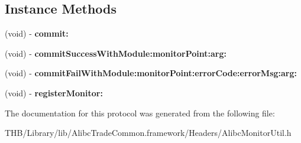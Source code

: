 \subsection*{Instance Methods}
\begin{DoxyCompactItemize}
\item 
\mbox{\label{protocol_alibc_trade_app_monitor_adapter_01-p_aec1a9063798149b59fa96aa601b44444}} 
(void) -\/ {\bfseries commit\+:}
\item 
\mbox{\label{protocol_alibc_trade_app_monitor_adapter_01-p_aa18270ea740aa94e6368a498f4a25fb4}} 
(void) -\/ {\bfseries commit\+Success\+With\+Module\+:monitor\+Point\+:arg\+:}
\item 
\mbox{\label{protocol_alibc_trade_app_monitor_adapter_01-p_aa58e8778c4e98ffc770f083e2ce935d7}} 
(void) -\/ {\bfseries commit\+Fail\+With\+Module\+:monitor\+Point\+:error\+Code\+:error\+Msg\+:arg\+:}
\item 
\mbox{\label{protocol_alibc_trade_app_monitor_adapter_01-p_a4f92eb451ae0f8271be5e3ebd0e1bc64}} 
(void) -\/ {\bfseries register\+Monitor\+:}
\end{DoxyCompactItemize}


The documentation for this protocol was generated from the following file\+:\begin{DoxyCompactItemize}
\item 
T\+H\+B/\+Library/lib/\+Alibc\+Trade\+Common.\+framework/\+Headers/Alibc\+Monitor\+Util.\+h\end{DoxyCompactItemize}
